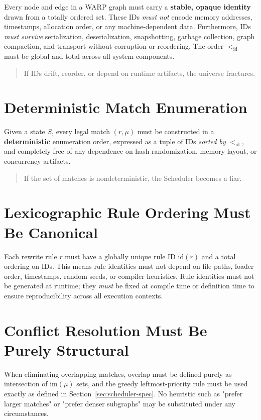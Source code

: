 Every node and edge in a WARP graph must carry a \textbf{stable, opaque identity}
drawn from a totally ordered set. These IDs \emph{must not} encode memory addresses, timestamps,
allocation order, or any machine-dependent data. Furthermore, IDs \emph{must survive} serialization,
deserialization, snapshotting, garbage collection, graph compaction, and transport without corruption
or reordering. The order $<_{\text{id}}$ must be global and total across all system components.

\begin{quote}
If IDs drift, reorder, or depend on runtime artifacts, the universe fractures.
\end{quote}

\section{Deterministic Match Enumeration}

Given a state $S$, every legal match $(r,\mu)$ must be constructed in a \textbf{deterministic}
enumeration order, expressed as a tuple of IDs \emph{sorted by} $<_{\text{id}}$, and completely
free of any dependence on hash randomization, memory layout, or concurrency artifacts.

\begin{quote}
If the set of matches is nondeterministic, the Scheduler becomes a liar.
\end{quote}

\section{Lexicographic Rule Ordering Must Be Canonical}

Each rewrite rule $r$ must have a globally unique rule ID $\mathrm{id}(r)$ and a total ordering on
IDs. This means rule identities must not depend on file paths, loader order, timestamps, random
seeds, or compiler heuristics. Rule identities must not be generated at runtime; they \emph{must}
be fixed at compile time or definition time to ensure reproducibility across all execution contexts.

\section{Conflict Resolution Must Be Purely Structural}

When eliminating overlapping matches, overlap must be defined purely as intersection of
$\mathrm{im}(\mu)$ sets, and the greedy leftmost-priority rule must be used exactly as defined in
Section~\ref{sec:scheduler-spec}. No heuristic such as "prefer larger matches" or "prefer denser
subgraphs" may be substituted under any circumstances.

